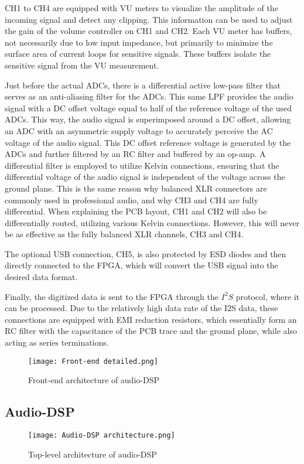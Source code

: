 CH1 to CH4 are equipped with VU meters to visualize the amplitude of the incoming signal and detect any clipping. This information can be used to adjust the gain of the volume controller on CH1 and CH2. Each VU meter has buffers, not necessarily due to low input impedance, but primarily to minimize the surface area of current loops for sensitive signals. These buffers isolate the sensitive signal from the VU measurement.

Just before the actual ADCs, there is a differential active low-pass filter that serves as an anti-aliasing filter for the ADCs. This same LPF provides the audio signal with a DC offset voltage equal to half of the reference voltage of the used ADCs. This way, the audio signal is superimposed around a DC offset, allowing an ADC with an asymmetric supply voltage to accurately perceive the AC voltage of the audio signal. This DC offset reference voltage is generated by the ADCs and further filtered by an RC filter and buffered by an op-amp. A differential filter is employed to utilize Kelvin connections, ensuring that the differential voltage of the audio signal is independent of the voltage across the ground plane. This is the same reason why balanced XLR connectors are commonly used in professional audio, and why CH3 and CH4 are fully differential. When explaining the PCB layout, CH1 and CH2 will also be differentially routed, utilizing various Kelvin connections. However, this will never be as effective as the fully balanced XLR channels, CH3 and CH4.

The optional USB connection, CH5, is also protected by ESD diodes and then directly connected to the FPGA, which will convert the USB signal into the desired data format.

Finally, the digitized data is sent to the FPGA through the $I^2S$ protocol, where it can be processed. Due to the relatively high data rate of the I2S data, these connections are equipped with EMI reduction resistors, which essentially form an RC filter with the capacitance of the PCB trace and the ground plane, while also acting as series terminations.

\begin{figure}[ht]
    \texttt{[image: Front-end detailed.png]}\\    
    \caption{Front-end architecture of audio-DSP}
    \label{fig:arch-front-end}
\end{figure}

\subsection{Audio-DSP}
\begin{figure}[ht]
    \texttt{[image: Audio-DSP architecture.png]}\\    
    \caption{Top-level architecture of audio-DSP}
    \label{fig:arch-top}
\end{figure}

